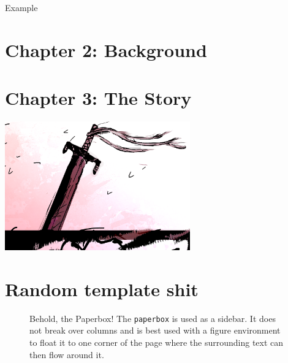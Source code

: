 \documentclass[letterpaper,10pt,twoside,twocolumn,openany]{book}
\begin{document}
\begin{paperbox}{Example}
  \lipsum[2]
\end{paperbox}

\clearpage





\chapter{Chapter 2: Background}


\clearpage

\chapter{Chapter 3: The Story}








\begin{center}
\includegraphics[width=80mm]{./img/otoriagrave.png}
\begin{figure}[h]
\end{figure}
\end{center}

\clearpage
 
 \chapter{Random template shit}
\clearpage






















\begin{figure}[!t]
	\begin{paperbox}{Behold, the Paperbox!}
		The \lstinline!paperbox! is used as a sidebar. It does not break over columns and is best used with a figure environment to float it to one corner of the page where the surrounding text can then flow around it.
	\end{paperbox}
\end{figure}
\end{document}
